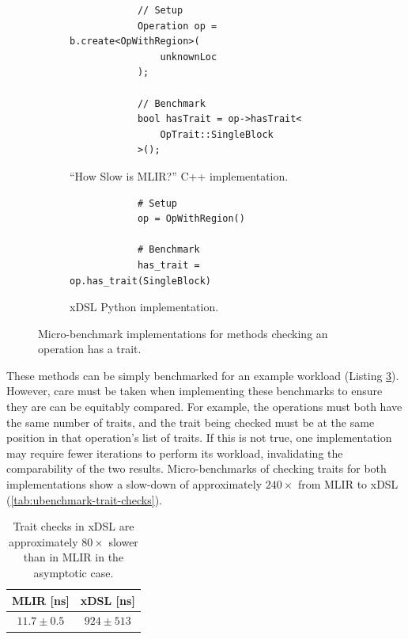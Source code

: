 \begin{figure}[H]
    \centering
    \begin{subfigure}[b]{0.45\textwidth}
       \centering
        \begin{verbatim}
            // Setup
            Operation op = b.create<OpWithRegion>(
                unknownLoc
            );

            // Benchmark
            bool hasTrait = op->hasTrait<
                OpTrait::SingleBlock
            >();
        \end{verbatim}
        \caption{``How Slow is MLIR?'' C++ implementation.}
        \label{listing:ubenchmark-trait-checks-bench-mlir}
    \end{subfigure}
    \hfill
    \begin{subfigure}[b]{0.45\textwidth}
        \centering
        \begin{verbatim}
            # Setup
            op = OpWithRegion()

            # Benchmark
            has_trait = op.has_trait(SingleBlock)
        \end{verbatim}
        \footnotesize\vspace{2em}
        \caption{xDSL Python implementation.}
        \label{listing:ubenchmark-trait-checks-bench-xdsl}
    \end{subfigure}
    \vspace{1em}
    \captionsetup{name=Listing}
    \caption{Micro-benchmark implementations for methods checking an operation has a trait.}
    \label{listing:ubenchmark-trait-checks-bench}
\end{figure}

These methods can be simply benchmarked for an example workload (Listing \ref{listing:ubenchmark-trait-checks-bench}).
However, care must be taken when implementing these benchmarks to ensure they are can be equitably compared. For example, the operations must both have the same number of traits, and the trait being checked must be at the same position in that operation's list of traits.
If this is not true, one implementation may require fewer iterations to perform its workload, invalidating the comparability of the two results.
Micro-benchmarks of checking traits for both implementations show a slow-down of approximately $240\times$ from MLIR to xDSL (\autoref{tab:ubenchmark-trait-checks}).

\begin{table}[H]
  \caption{Trait checks in xDSL are approximately $80\times$ slower than in MLIR in the asymptotic case.}
  \label{tab:ubenchmark-trait-checks}
  \centering
  \begin{tabular}{cc}
    \toprule
    \textbf{MLIR [ns]} & \textbf{xDSL [ns]}\\
    \midrule
    $11.7 \pm 0.5$ & $924 \pm 513$ \\
    \bottomrule
  \end{tabular}
\end{table}


